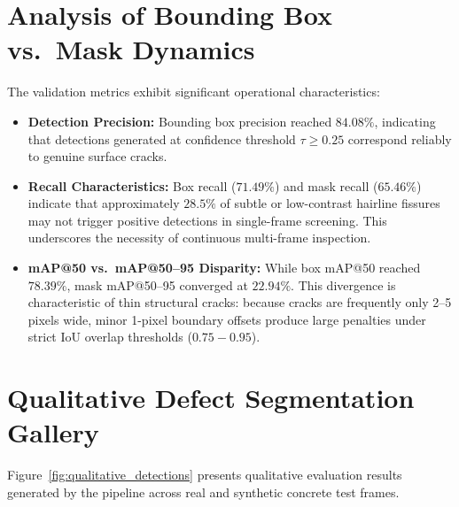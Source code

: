 \documentclass[12pt,a4paper,oneside]{report}
\begin{document}
\section{Analysis of Bounding Box vs.\ Mask Dynamics}
The validation metrics exhibit significant operational characteristics:
\begin{itemize}
  \item \textbf{Detection Precision:} Bounding box precision reached $84.08\%$, indicating that detections generated at confidence threshold $\tau \ge 0.25$ correspond reliably to genuine surface cracks.
  \item \textbf{Recall Characteristics:} Box recall ($71.49\%$) and mask recall ($65.46\%$) indicate that approximately $28.5\%$ of subtle or low-contrast hairline fissures may not trigger positive detections in single-frame screening. This underscores the necessity of continuous multi-frame inspection.
  \item \textbf{mAP@50 vs.\ mAP@50--95 Disparity:} While box mAP@50 reached $78.39\%$, mask mAP@50--95 converged at $22.94\%$. This divergence is characteristic of thin structural cracks: because cracks are frequently only 2--5 pixels wide, minor 1-pixel boundary offsets produce large penalties under strict IoU overlap thresholds ($0.75-0.95$).
\end{itemize}

\section{Qualitative Defect Segmentation Gallery}
Figure~\ref{fig:qualitative_detections} presents qualitative evaluation results generated by the pipeline across real and synthetic concrete test frames.
\end{document}
